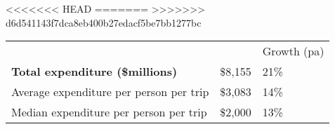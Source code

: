 <<<<<<< HEAD
=======
>>>>>>> d6d541143f7dca8eb400b27edacf5be7bb1277bc
\begin{tabular}[t]{p{4.85cm}>{\hfill}p{1.3cm}>{\hfill}p{1.35cm}}
    &   & Growth (pa) \\ 
 \textbf{Total expenditure (\$millions)} & \$8,155 & 21\% \\ 
  Average expenditure per person per trip & \$3,083 & 14\% \\ 
  Median expenditure per person per trip & \$2,000 & 13\% \\ 
  \end{tabular}
